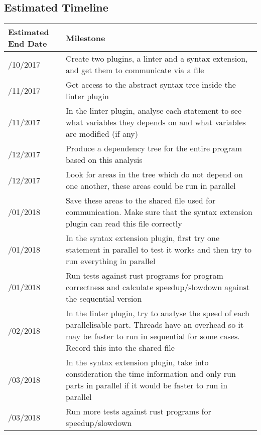 \documentclass[12pt, a4paper]{article}
\begin{document}
\subsection{Estimated Timeline}
\begin{tabularx}{\textwidth}{ | >{\hsize=0.15\hsize}X | >{\hsize=0.85\hsize}X |}
	\hline
	\textbf{Estimated End Date} & \textbf{Milestone} \\
	\hline
	30/10/2017 & Create two plugins, a linter and a syntax extension, and get them to communicate via a file \\
	\hline
	13/11/2017 & Get access to the abstract syntax tree inside the linter plugin \\
	\hline
	27/11/2017 & In the linter plugin, analyse each statement to see what variables they depends on and what variables are modified (if any) \\
	\hline
	11/12/2017 & Produce a dependency tree for the entire program based on this analysis \\
	\hline
	25/12/2017 & Look for areas in the tree which do not depend on one another, these areas could be run in parallel \\
	\hline
	08/01/2018 & Save these areas to the shared file used for communication. Make sure that the syntax extension plugin can read this file correctly \\
	\hline
	22/01/2018 & In the syntax extension plugin, first try one statement in parallel to test it works and then try to run everything in parallel \\
	\hline
	29/01/2018 & Run tests against rust programs for program correctness and calculate speedup/slowdown against the sequential version \\
	\hline
	12/02/2018 & In the linter plugin, try to analyse the speed of each parallelisable part. Threads have an overhead so it may be faster to run in sequential for some cases. Record this into the shared file \\
	\hline
	26/03/2018 & In the syntax extension plugin, take into consideration the time information and only run parts in parallel if it would be faster to run in parallel \\
	\hline
	05/03/2018 & Run more tests against rust programs for speedup/slowdown \\
	\hline
\end{tabularx}
\end{document}
